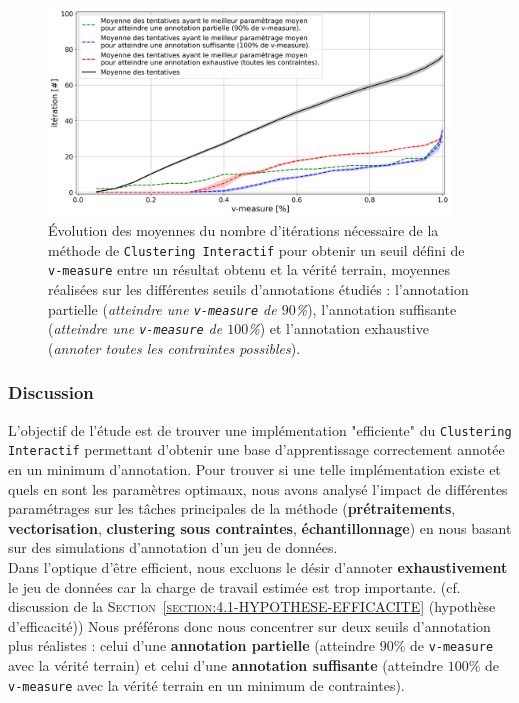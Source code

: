 			\begin{figure}[!htb]
				\centering
				\includegraphics[width=0.95\textwidth]{figures/etude-efficience-evolution-moyenne-5best-par-vmeasure}
				\caption{
					Évolution des moyennes du nombre d'itérations nécessaire de la méthode de \texttt{Clustering Interactif} pour obtenir un seuil défini de \texttt{v-measure} entre un résultat obtenu et la vérité terrain, moyennes réalisées sur les différentes seuils d'annotations étudiés : l'annotation partielle (\textit{atteindre une \texttt{v-measure} de $90$\%}), l'annotation suffisante (\textit{atteindre une \texttt{v-measure} de $100$\%}) et l'annotation exhaustive (\textit{annoter toutes les contraintes possibles}).
				}
				\label{figure:4.2.1-ETUDE-OPTIMISATION-EVOLUTION-MEILLEUR-PARAMETRAGE}
			\end{figure}

		\subsubsection{Discussion}

			L'objectif de l'étude est de trouver une implémentation "efficiente" du \texttt{Clustering Interactif} permettant d'obtenir une base d'apprentissage correctement annotée en un minimum d'annotation.
			Pour trouver si une telle implémentation existe et quels en sont les paramètres optimaux, nous avons analysé l'impact de différentes paramétrages sur les tâches principales de la méthode (\textbf{prétraitements}, \textbf{vectorisation}, \textbf{clustering sous contraintes}, \textbf{échantillonnage}) en nous basant sur des simulations d'annotation d'un jeu de données.
			\\
			
			Dans l'optique d'être efficient, nous excluons le désir d'annoter \textbf{exhaustivement} le jeu de données car la charge de travail estimée est trop importante.
			(cf. discussion de la \textsc{Section~\ref{section:4.1-HYPOTHESE-EFFICACITE}} (hypothèse d'efficacité))
			Nous préférons donc nous concentrer sur deux seuils d'annotation plus réalistes : celui d'une \textbf{annotation partielle} (atteindre $90$\% de \texttt{v-measure} avec la vérité terrain) et celui d'une \textbf{annotation suffisante} (atteindre $100$\% de \texttt{v-measure} avec la vérité terrain en un minimum de contraintes). 
			
